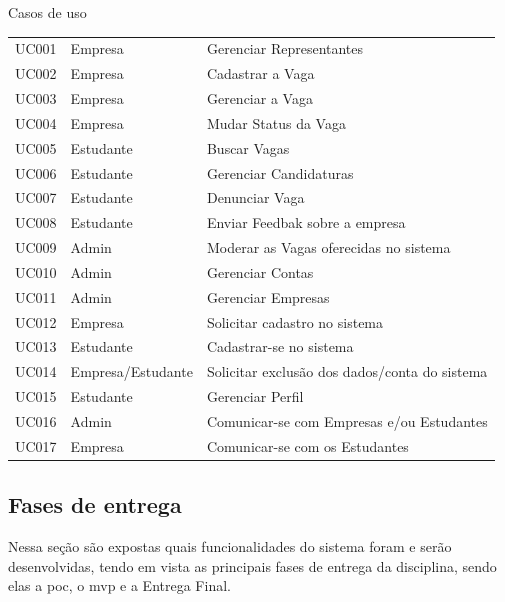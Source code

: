\begin{quadro}[H]
	\centering
	\ABNTEXfontereduzida
	\caption{Casos de uso}
	\label{user-cases}
	\begin{tabular}{|l|p{4 cm}|p{9 cm}|}
		\hline 
		\thead{Código} & \thead[l]{Ator} & \thead[l]{Descrição} \\
		\hline
		UC001 & Empresa & Gerenciar Representantes\\
		\hline
		UC002 & Empresa & Cadastrar a Vaga \\
		\hline
		UC003 & Empresa & Gerenciar a Vaga \\
		\hline
		UC004 & Empresa & Mudar Status da Vaga \\
		\hline
		UC005 & Estudante & Buscar Vagas \\
		\hline
		UC006 & Estudante & Gerenciar Candidaturas \\
		\hline
		UC007 & Estudante & Denunciar Vaga \\
		\hline
		UC008 & Estudante & Enviar Feedbak sobre a empresa \\
		\hline
		UC009 & Admin & Moderar as Vagas oferecidas no sistema \\
		\hline
		UC010 & Admin & Gerenciar Contas \\
		\hline
		UC011 & Admin & Gerenciar Empresas \\
		\hline
		UC012 & Empresa & Solicitar cadastro no sistema \\
		\hline
		UC013 & Estudante & Cadastrar-se no sistema \\
		\hline
		UC014 & Empresa/Estudante & Solicitar exclusão dos dados/conta do sistema \\
		\hline
		UC015 & Estudante & Gerenciar Perfil \\
		\hline
		UC016 & Admin & Comunicar-se com Empresas e/ou Estudantes \\
		\hline
		UC017 & Empresa & Comunicar-se com os Estudantes \\
		\hline
	\end{tabular}
\end{quadro}

\subsection{Fases de entrega}

Nessa seção são expostas quais funcionalidades do sistema foram e serão desenvolvidas, tendo em vista as principais fases de entrega da disciplina, sendo elas a \ac{poc}, o \ac{mvp} e a Entrega Final.


